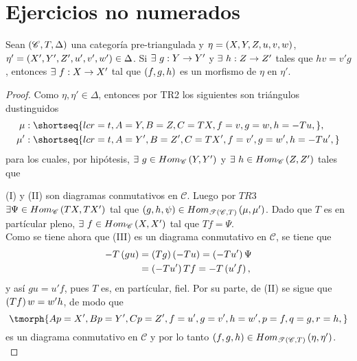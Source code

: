 \documentclass{article}
\begin{document}
	\section*{Ejercicios no numerados}
	\begin{propsn}
		Sean $\left(\mathscr{C},T,\Delta\right)$ una categoría pre-triangulada y $\eta=\left(X,Y,Z,u,v,w\right)$, $\eta'=\left(X',Y',Z',u',v',w'\right)\in\Delta$. Si $\exists\ \catarrow{g}{Y}{Y'}{}$ y $\exists\ \catarrow{h}{Z}{Z'}{}$ tales que $hv=v'g$, entonces $\exists\ \catarrow{f}{X}{X'}{}$ tal que $\left(f,g,h\right)$ es un morfismo de $\eta$ en $\eta'$.
	\end{propsn}
	\begin{proof}
		Como $\eta,\eta'\in\Delta$, entonces por TR2 los siguientes son triángulos dustinguidos
		\begin{align*}
			\mu&:\shortseq{lcr=t,A=Y,B=Z,C=TX,f=v,g=w,h=-Tu,},\\
			\mu'&:\shortseq{lcr=t,A=Y',B=Z',C=TX',f=v',g=w',h=-Tu',}
		\end{align*}
		para los cuales, por hipótesis, $\exists\ g\in\ringmodhom{\mathscr{C}}{Y}{Y'}$ y $\exists\ h\in\ringmodhom{\mathscr{C}}{Z}{Z'}$ tales que
		\begin{center}
		\end{center}
		(I) y (II) son diagramas conmutativos en $\mathscr{C}$. Luego por $TR3$ $\exists\Psi\in Hom_{\mathscr{C}}\left(TX,TX'\right)$ tal que $\left(g,h,\psi\right)\in Hom_{\mathscr{T}\left(\mathscr{C},T\right)}\left(\mu,\mu'\right)$. Dado que $T$ es en partícular pleno, $\exists\ f\in\ringmodhom{\mathscr{C}}{X}{X'}$ tal que $Tf=\Psi$.\\
		Como se tiene ahora que (III) es un diagrama conmutativo en $\mathscr{C}$, se tiene que
		\begin{align*}
			-T\left(gu\right)&=\left(Tg\right)\left(-Tu\right)=\left(-Tu'\right)\Psi\\
			&=\left(-Tu'\right)Tf=-T\left(u'f\right),
		\end{align*} 
		y así $gu=u'f$, pues $T$ es, en partícular, fiel. Por su parte, de (II) se sigue que $\left(Tf\right)w=w'h$, de modo que
		\begin{equation*}
			\tmorph{Ap=X',Bp=Y',Cp=Z',f=u',g=v',h=w',p=f,q=g,r=h,}
		\end{equation*}
		 es un diagrama conmutativo en $\mathscr{C}$ y por lo tanto $\left(f,g,h\right)\in Hom_{\mathscr{T}\left(\mathscr{C},T\right)}\left(\eta,\eta'\right)$.\\
	\end{proof}
\end{document}
